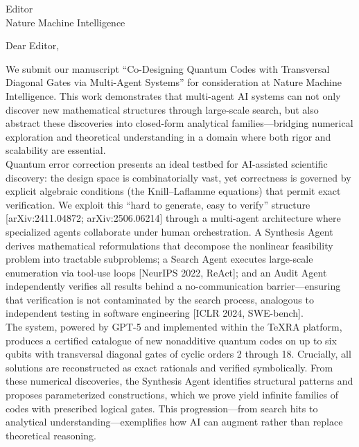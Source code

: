 \documentclass[a4paper,12pt]{letter}
\begin{document}
\begin{letter}{Editor\\Nature Machine Intelligence}

    \opening{Dear Editor,}

    We submit our manuscript ``Co-Designing Quantum Codes with Transversal Diagonal Gates via Multi-Agent Systems'' for consideration at Nature Machine Intelligence. This work demonstrates that multi-agent AI systems can not only discover new mathematical structures through large-scale search, but also abstract these discoveries into closed-form analytical families---bridging numerical exploration and theoretical understanding in a domain where both rigor and scalability are essential.\\

    Quantum error correction presents an ideal testbed for AI-assisted scientific discovery: the design space is combinatorially vast, yet correctness is governed by explicit algebraic conditions (the Knill--Laflamme equations) that permit exact verification. We exploit this ``hard to generate, easy to verify'' structure [arXiv:2411.04872; arXiv:2506.06214] through a multi-agent architecture where specialized agents collaborate under human orchestration. A Synthesis Agent derives mathematical reformulations that decompose the nonlinear feasibility problem into tractable subproblems; a Search Agent executes large-scale enumeration via tool-use loops [NeurIPS 2022, ReAct]; and an Audit Agent independently verifies all results behind a no-communication barrier---ensuring that verification is not contaminated by the search process, analogous to independent testing in software engineering [ICLR 2024, SWE-bench].\\

    The system, powered by GPT-5 and implemented within the TeXRA platform, produces a certified catalogue of new nonadditive quantum codes on up to six qubits with transversal diagonal gates of cyclic orders 2 through 18. Crucially, all solutions are reconstructed as exact rationals and verified symbolically. From these numerical discoveries, the Synthesis Agent identifies structural patterns and proposes parameterized constructions, which we prove yield infinite families of codes with prescribed logical gates. This progression---from search hits to analytical understanding---exemplifies how AI can augment rather than replace theoretical reasoning.\\


\end{letter}
\end{document}
